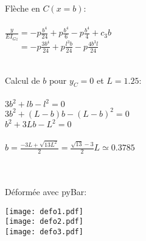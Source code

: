 \documentclass[a4paper]{article}
\begin{document}
~\\
~\\
\begin{minipage}[t]{9cm}
Flèche en $C(x = b)$:\\
~\\
$\frac{y}{EI_{Gz}} = -p\frac{b^4}{24} + p\frac{b^4}{6} - p\frac{b^4}{4} + c_3b$
~\\
$\phantom{\frac{y}{EI_{Gz}}} =
 -p\frac{3b^4}{24} + p\frac{l^3b}{24} - p\frac{4b^3l}{24}$\\
~\\
\end{minipage}
\begin{minipage}[t]{10cm}
Calcul de $b$ pour $y_C=0$ et $L=1.25$:\\
~\\
$3b^2 + lb - l^2 = 0$\\
$3b^2 + (L - b)b - (L - b)^2 = 0$\\
$b^2 + 3Lb - L^2 = 0$\\
~\\
$b = \frac{-3L + \sqrt{13L^2}}{2} = \frac{\sqrt{13} - 3}{2}L \simeq 0.3785$
\end{minipage}
~\\
~\\
Déformée avec pyBar:\\
\begin{center}
\texttt{[image: defo1.pdf]}\\
\texttt{[image: defo2.pdf]}\\
\texttt{[image: defo3.pdf]}
\end{center}
\end{document}
